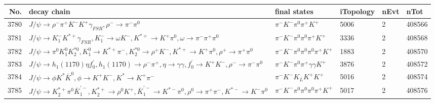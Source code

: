 \begin{table}[htbp] 
\begin{center}
\begin{small}
\begin{tabular}{rlllll}\hline\hline
 No. & decay chain & final states &  iTopology & nEvt & nTot \\\hline
3780&$J/\psi       \rightarrow \rho^{-}      \pi^{+}        K^{-}          K^{+}          \gamma_{FSR} , \rho^{-}       \rightarrow \pi^{-}        \pi^{0}        $&$\pi^{-}        K^{-}          \pi^{0}        \pi^{+}        K^{+}          $& 5006&    2&408566\\
3781&$J/\psi       \rightarrow K_{1}^{-}      K^{*+}         \gamma_{FSR} , K_{1}^{-}       \rightarrow \omega         K^{-}          , K^{*+}          \rightarrow K^{+}          \pi^{0}        , \omega          \rightarrow \pi^{-}        \pi^{+}        \pi^{0}        $&$\pi^{-}        K^{-}          \pi^{0}        \pi^{0}        \pi^{+}        K^{+}          $& 3336&    2&408568\\
3782&$J/\psi       \rightarrow \pi^{0}        K_1^{0}        K_2^{*0}       , K_1^{0}         \rightarrow K^{*+}         \pi^{-}        , K_2^{*0}        \rightarrow \rho^{+}      K^{-}          , K^{*+}          \rightarrow K^{+}          \pi^{0}        , \rho^{+}       \rightarrow \pi^{+}        \pi^{0}        $&$\pi^{-}        K^{-}          \pi^{0}        \pi^{0}        \pi^{0}        \pi^{+}        K^{+}          $& 1883&    2&408570\\
3783&$J/\psi       \rightarrow h_{1}(1170)    \eta          f^{'}_{0}     , h_{1}(1170)     \rightarrow \rho^{-}      \pi^{+}        , \eta           \rightarrow \gamma       \gamma       , f^{'}_{0}      \rightarrow K^{+}          K^{-}          , \rho^{-}       \rightarrow \pi^{-}        \pi^{0}        $&$\pi^{-}        K^{-}          \pi^{0}        \pi^{+}        \gamma       \gamma       K^{+}          $& 3876&    2&408572\\
3784&$J/\psi       \rightarrow \phi           K^{*}          \bar{K}^{0}   , \phi            \rightarrow K^{+}          K^{-}          , K^{*}           \rightarrow K^{+}          \pi^{-}        $&$\pi^{-}        K^{-}          K_{L}          K^{+}          K^{+}          $& 5016&    2&408574\\
3785&$J/\psi       \rightarrow K_2^{*+}       \pi^{0}        \bar{K}_1^{'-}, K_2^{*+}        \rightarrow \rho^{0}      K^{+}          , \bar{K}_1^{'-} \rightarrow K^{*-}         \pi^{0}        , \rho^{0}       \rightarrow \pi^{+}        \pi^{-}        , K^{*-}          \rightarrow K^{-}          \pi^{0}        $&$\pi^{-}        K^{-}          \pi^{0}        \pi^{0}        \pi^{0}        \pi^{+}        K^{+}          $& 5017&    2&408576\\

\end{tabular}
\end{small}
\end{center}
\end{table}
